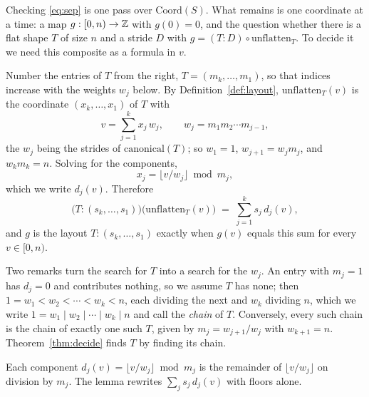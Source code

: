 Checking \eqref{eq:sep} is one pass over $\mathrm{Coord}(S)$. What remains
is one coordinate at a time: a map $g : [0,n) \to \mathbb{Z}$ with $g(0) = 0$, and
the question whether there is a flat shape $T$ of size $n$ and a stride $D$
with $g = (T{:}D) \circ \mathrm{unflatten}_T$. To decide it we need this
composite as a formula in $v$.

Number the entries of $T$ from the right, $T = (m_k,\dots,m_1)$, so that
indices increase with the weights $w_j$ below. By Definition~\ref{def:layout},
$\mathrm{unflatten}_T(v)$ is the coordinate $(x_k,\dots,x_1)$ of $T$ with
\[
v = \sum_{j=1}^{k} x_j\, w_j, \qquad w_j = m_1 m_2 \cdots m_{j-1},
\]
the $w_j$ being the strides of $\mathrm{canonical}(T)$; so $w_1 = 1$,
$w_{j+1} = w_j m_j$, and $w_k m_k = n$. Solving for the components,
\[
x_j = \lfloor v / w_j \rfloor \bmod m_j,
\]
which we write $d_j(v)$. Therefore
\[
\big(T{:}(s_k,\dots,s_1)\big)\big(\mathrm{unflatten}_T(v)\big)
\;=\; \sum_{j=1}^{k} s_j\, d_j(v),
\]
and $g$ is the layout $T{:}(s_k,\dots,s_1)$ exactly when $g(v)$ equals this
sum for every $v \in [0,n)$.

Two remarks turn the search for $T$ into a search for the $w_j$. An entry
with $m_j = 1$ has $d_j = 0$ and contributes nothing, so we assume $T$ has
none; then $1 = w_1 < w_2 < \cdots < w_k < n$, each dividing the next and
$w_k$ dividing $n$, which we write $1 = w_1 \mid w_2 \mid \cdots \mid w_k
\mid n$ and call the \emph{chain} of $T$. Conversely, every such chain is
the chain of exactly one such $T$, given by $m_j = w_{j+1}/w_j$ with
$w_{k+1} = n$. Theorem~\ref{thm:decide} finds $T$ by finding its chain.

Each component $d_j(v) = \lfloor v/w_j \rfloor \bmod m_j$ is the remainder
of $\lfloor v/w_j \rfloor$ on division by $m_j$. The lemma rewrites
$\sum_j s_j\, d_j(v)$ with floors alone.


